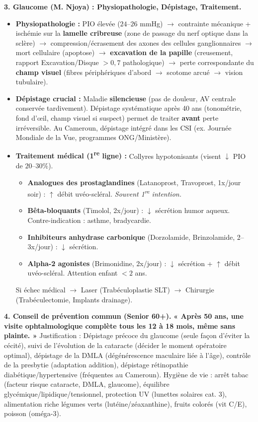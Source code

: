 \documentclass[11pt]{article}
\begin{document}
\begin{exoresolu}
\textbf{3. Glaucome (M. Njoya) : Physiopathologie, Dépistage, Traitement.}
\begin{itemize}
    \item \textbf{Physiopathologie :} PIO élevée ($24$--$26$ mmHg) $\rightarrow$ contrainte mécanique + ischémie sur la \textbf{lamelle cribreuse} (zone de passage du nerf optique dans la sclère) $\rightarrow$ compression/écrasement des axones des cellules ganglionnaires $\rightarrow$ mort cellulaire (apoptose) $\rightarrow$ \textbf{excavation de la papille} (creusement, rapport Excavation/Disque $> 0,7$ pathologique) $\rightarrow$ perte correspondante du \textbf{champ visuel} (fibres périphériques d'abord $\rightarrow$ scotome arcué $\rightarrow$ vision tubulaire).
    \item \textbf{Dépistage crucial :} Maladie \textbf{silencieuse} (pas de douleur, AV centrale conservée tardivement). Dépistage systématique après 40 ans (tonométrie, fond d'œil, champ visuel si suspect) permet de traiter \textbf{avant} perte irréversible. Au Cameroun, dépistage intégré dans les CSI (ex. Journée Mondiale de la Vue, programmes ONG/Ministère).
    \item \textbf{Traitement médical (1\textsuperscript{re} ligne) :} Collyres hypotonisants (visent $\downarrow$ PIO de $20$--$30\%$).
    \begin{itemize}
        \item \textbf{Analogues des prostaglandines} (Latanoprost, Travoprost, 1x/jour soir) : $\uparrow$ débit uvéo-scléral. \emph{Souvent 1\textsuperscript{re} intention.}
        \item \textbf{Bêta-bloquants} (Timolol, 2x/jour) : $\downarrow$ sécrétion humor aqueux. Contre-indication : asthme, bradycardie.
        \item \textbf{Inhibiteurs anhydrase carbonique} (Dorzolamide, Brinzolamide, 2--3x/jour) : $\downarrow$ sécrétion.
        \item \textbf{Alpha-2 agonistes} (Brimonidine, 2x/jour) : $\downarrow$ sécrétion + $\uparrow$ débit uvéo-scléral. Attention enfant $< 2$ ans.
    \end{itemize}
    Si échec médical $\rightarrow$ Laser (Trabéculoplastie SLT) $\rightarrow$ Chirurgie (Trabéculectomie, Implants drainage).
\end{itemize}

\textbf{4. Conseil de prévention commun (Senior 60+).}
\textbf{« Après 50 ans, une visite ophtalmologique complète tous les 12 à 18 mois, même sans plainte. »} Justification : Dépistage précoce du glaucome (seule façon d'éviter la cécité), suivi de l'évolution de la cataracte (décider le moment opératoire optimal), dépistage de la DMLA (dégénérescence maculaire liée à l'âge), contrôle de la presbytie (adaptation addition), dépistage rétinopathie diabétique/hypertensive (fréquentes au Cameroun). Hygiène de vie : arrêt tabac (facteur risque cataracte, DMLA, glaucome), équilibre glycémique/lipidique/tensionnel, protection UV (lunettes solaires cat. 3), alimentation riche légumes verts (lutéine/zéaxanthine), fruits colorés (vit C/E), poisson (oméga-3).
\end{exoresolu}
\end{document}

